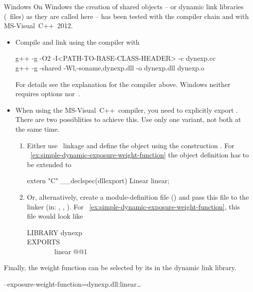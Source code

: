 \medskip

\begin{restrictedmaterial}{Windows}
  \noindent On Windows the creation of shared objects -- or dynamic link libraries
  (~files) as they are called here -- has been tested with the 
  compiler chain and with MS-Visual~C++~2012.

  \begin{itemize}
  \item
    Compile and link using the  compiler with

    \begin{literal}
      g++ -g -O2 -I<PATH-TO-BASE-CLASS-HEADER> -c dynexp.cc \\
      g++ -g -shared -Wl,-soname,dynexp.dll -o dynexp.dll dynexp.o
    \end{literal}

    For details see the explanation for the  compiler above.  Windows neither
    requires options  nor~.

  \item
    When using the MS-Visual~C++~compiler, you need to explicitly export .
    There are two possiblities to achieve this.  Use only one variant, not both at the same
    time.

    \begin{enumerate}
    \item
      Either use ~linkage and define the object using the construction
      .  For
      \exampleName~\ref{ex:simple-dynamic-exposure-weight-function} the object definition has to
      be extended to

      \begin{cxxlisting}
extern "C"
{
  __declspec(dllexport) Linear linear;
}
      \end{cxxlisting}

    \item
      Or, alternatively, create a module-definition file () and pass this file to
      the linker (in: , , ).  For \exampleName~\ref{ex:simple-dynamic-exposure-weight-function},
      this file would look like

      \begin{literal}
        LIBRARY dynexp \\
        EXPORTS \\
        ~~~~~~~~linear @@1 \\
      \end{literal}
    \end{enumerate}
  \end{itemize}

  Finally, the weight function can be selected by its  in the dynamic link
  library.

  \begin{literal}
    \app{} --exposure-weight-function=dynexp.dll:linear\dots
  \end{literal}
\end{restrictedmaterial}

